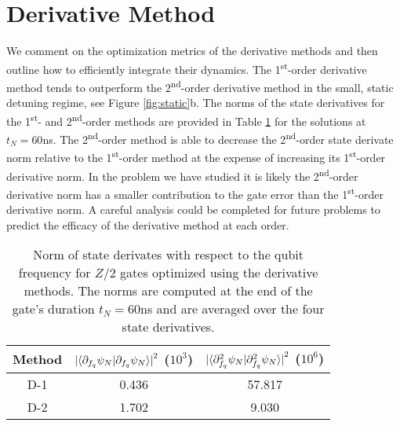\section{Derivative Method}
\label{appendix:derivative}
We comment on the optimization metrics of the derivative methods and then
outline how to efficiently integrate their dynamics.
The 1\textsuperscript{st}-order derivative method tends
to outperform the 2\textsuperscript{nd}-order
derivative method in the small, static detuning regime, see Figure \ref{fig:static}b.
The norms of the state derivatives for the 1\textsuperscript{st}- and 2\textsuperscript{nd}-order
methods are provided in Table \ref{tab:dnorm} for the solutions at $t_{N} = 60$ns.
The 2\textsuperscript{nd}-order method is able to decrease the 2\textsuperscript{nd}-order
state derivate norm relative to the 1\textsuperscript{st}-order method at the expense of increasing
its 1\textsuperscript{st}-order derivative norm. In the problem
we have studied it is likely the 2\textsuperscript{nd}-order derivative norm has a smaller
contribution to the gate error than the 1\textsuperscript{st}-order derivative norm. A
careful analysis could be completed for future problems to predict the efficacy of the
derivative method at each order.

\begin{table}[h]
  \begin{tabular}{c | c | c}
    Method & ${\lvert \braket{\partial_{f_{q}} \psi_{N} | \partial_{f_{q}} \psi_{N}} \rvert}^{2}$ ($10^{3}$)
    & ${\lvert \braket{\partial^{2}_{f_{q}} \psi_{N} | \partial^{2}_{f_{q}} \psi_{N}} \rvert}^{2}$ ($10^{6}$)\\
    \hline
    D-1 & 0.436 & 57.817\\
    D-2 & 1.702 & 9.030\\
  \end{tabular}
  \caption{Norm of state derivates with respect to the qubit frequency
    for $Z/2$ gates optimized using the derivative methods. The norms are computed
    at the end of the gate's duration $t_{N} = 60$ns and are averaged over the four state derivatives.}
  \label{tab:dnorm}
\end{table}


